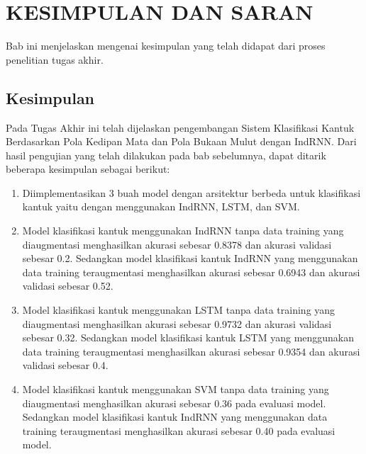 \chapter{KESIMPULAN DAN SARAN}
\label{chap:penutup}

Bab ini menjelaskan mengenai kesimpulan yang telah didapat dari proses penelitian
tugas akhir.

\section{Kesimpulan}
\label{sec:kesimpulan}

Pada Tugas Akhir ini telah dijelaskan pengembangan Sistem Klasifikasi Kantuk Berdasarkan
Pola Kedipan Mata dan Pola Bukaan Mulut dengan IndRNN. Dari hasil pengujian yang telah
dilakukan pada bab sebelumnya, dapat ditarik beberapa kesimpulan sebagai berikut:


\begin{enumerate}[nolistsep]
      \item Diimplementasikan 3 buah model dengan arsitektur berbeda untuk klasifikasi kantuk yaitu dengan
            menggunakan IndRNN, LSTM, dan SVM.

      \item Model klasifikasi kantuk menggunakan IndRNN tanpa data training yang
            diaugmentasi menghasilkan akurasi sebesar 0.8378 dan akurasi validasi sebesar 0.2.
            Sedangkan model klasifikasi kantuk IndRNN yang menggunakan data training teraugmentasi
            menghasilkan akurasi sebesar 0.6943 dan akurasi validasi sebesar 0.52.

      \item Model klasifikasi kantuk menggunakan LSTM tanpa data training yang
      diaugmentasi menghasilkan akurasi sebesar 0.9732 dan akurasi validasi sebesar 0.32.
      Sedangkan model klasifikasi kantuk LSTM yang menggunakan data training teraugmentasi
      menghasilkan akurasi sebesar 0.9354 dan akurasi validasi sebesar 0.4.

      \item Model klasifikasi kantuk menggunakan SVM tanpa data training yang
      diaugmentasi menghasilkan akurasi sebesar 0.36 pada evaluasi model.
      Sedangkan model klasifikasi kantuk IndRNN yang menggunakan data training teraugmentasi
      menghasilkan akurasi sebesar 0.40 pada evaluasi model.

\end{enumerate}

